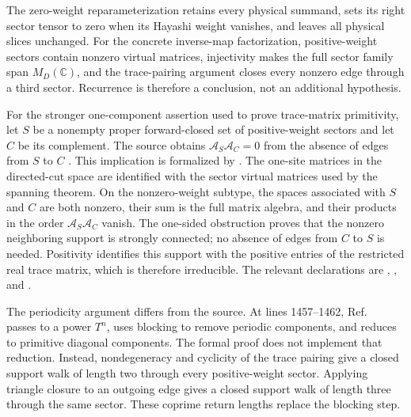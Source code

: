 \documentclass{article}
\begin{document}
The zero-weight reparameterization retains every physical summand, sets its
right sector tensor to zero when its Hayashi weight vanishes, and leaves all
physical slices unchanged. For the concrete inverse-map factorization,
positive-weight sectors contain nonzero virtual matrices, injectivity makes the
full sector family span $M_D(\mathbb C)$, and the trace-pairing argument closes
every nonzero edge through a third sector. Recurrence is therefore a
conclusion, not an additional hypothesis.

For the stronger one-component assertion used to prove trace-matrix
primitivity, let $S$ be a nonempty proper forward-closed set of positive-weight
sectors and let $C$ be its complement. The source obtains
$\mathcal A_S\mathcal A_C=0$ from the absence of edges from $S$ to $C$
\cite[Appendix~C.2]{Cirac2016MPDO_arXiv}. This implication is formalized by
.
The one-site matrices in the directed-cut space are identified with the sector
virtual matrices used by the spanning theorem. On the nonzero-weight subtype,
the spaces associated with $S$ and $C$ are both nonzero, their sum is the full
matrix algebra, and their products in the order
$\mathcal A_S\mathcal A_C$ vanish. The one-sided obstruction proves that the
nonzero neighboring support is strongly connected; no absence of edges from
$C$ to $S$ is needed. Positivity identifies this support with the positive
entries of the restricted real trace matrix, which is therefore irreducible.
The relevant declarations are
,
,
and
.

The periodicity argument differs from the source. At lines 1457--1462,
Ref.~\cite{Cirac2016MPDO_arXiv} passes to a power $T^n$, uses blocking to
remove periodic components, and reduces to primitive diagonal components. The
formal proof does not implement that reduction. Instead, nondegeneracy and
cyclicity of the trace pairing give a closed support walk of length two through
every positive-weight sector. Applying triangle closure to an outgoing edge
gives a closed support walk of length three through the same sector. These
coprime return lengths replace the blocking step.
\end{document}
